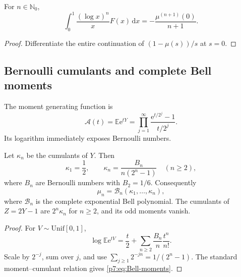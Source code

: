 \documentclass[11pt,oneside]{article}
\theoremstyle{definition}
\theoremstyle{remark}
\newcommand{\E}{\mathbb E}
\newcommand{\N}{\mathbb N}
\newcommand{\dd}{\,\mathrm d}
\newcommand{\e}{\mathrm e}
\newcommand{\1}{\mathbf 1}
\begin{document}
\begin{corollary}
For $n\in\N_0$,
\begin{equation}
 \int_0^1\frac{(\log x)^n}{x}F(x)\dd x
 =-\frac{\mu^{(n+1)}(0)}{n+1}.
 \label{p7:eq:log-F-moments}
\end{equation}
\end{corollary}

\begin{proof}
Differentiate the entire continuation of $(1-\mu(s))/s$ at $s=0$.
\end{proof}

\subsection{Bernoulli cumulants and complete Bell moments}

The moment generating function is
\begin{equation}
 \mathscr A(t)=\E\e^{tY}
 =\prod_{j=1}^{\infty}\frac{\e^{t/2^j}-1}{t/2^j}.
 \label{p7:eq:Y-mgf}
\end{equation}
Its logarithm immediately exposes Bernoulli numbers.

\begin{proposition}[Cumulants]
\label{p7:prop:cumulants}
Let $\kappa_n$ be the cumulants of $Y$.  Then
\begin{equation}
 \kappa_1=\frac12,
 \qquad
 \kappa_n=\frac{B_n}{n(2^n-1)}\quad(n\ge2),
 \label{p7:eq:Y-cumulants}
\end{equation}
where $B_n$ are Bernoulli numbers with $B_2=1/6$.  Consequently
\begin{equation}
 \mu_n=\mathcal B_n(\kappa_1,\ldots,\kappa_n),
 \label{p7:eq:Bell-moments}
\end{equation}
where $\mathcal B_n$ is the complete exponential Bell polynomial.  The cumulants of
$Z=2Y-1$ are $2^n\kappa_n$ for $n\ge2$, and its odd moments vanish.
\end{proposition}

\begin{proof}
For $V\sim\mathrm{Unif}[0,1]$,
\[
 \log\E\e^{tV}=\frac t2+\sum_{n\ge2}\frac{B_n}{n}\frac{t^n}{n!}.
\]
Scale by $2^{-j}$, sum over $j$, and use
$\sum_{j\ge1}2^{-jn}=1/(2^n-1)$.  The standard moment--cumulant relation gives
\cref{p7:eq:Bell-moments}.
\end{proof}

\begin{table}[H]
\centering
\caption{Exact moments generated from Bernoulli cumulants.}
\label{p7:tab:moments}

\end{table}
\end{document}
